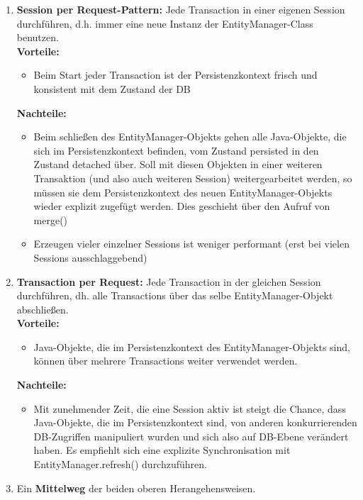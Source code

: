 \begin{enumerate}
    \item \textbf{Session per Request-Pattern:} Jede Transaction in einer eigenen Session durchführen, d.h. immer eine neue Instanz der EntityManager-Class benutzen.\\
          \textbf{Vorteile:}
          \begin{itemize}
              \item Beim Start jeder Transaction ist der Persistenzkontext frisch und konsistent mit dem Zustand der DB
          \end{itemize}
          \textbf{Nachteile:}
          \begin{itemize}
              \item Beim schließen des EntityManager-Objekts gehen alle Java-Objekte, die sich im Persistenzkontext befinden, vom Zustand persisted in den Zustand detached über. Soll mit diesen Objekten in einer weiteren Transaktion (und also auch weiteren Session) weitergearbeitet werden, so müssen sie dem Persistenzkontext des neuen EntityManager-Objekts wieder explizit zugefügt werden. Dies geschieht über den Aufruf von merge()
              \item Erzeugen vieler einzelner Sessions ist weniger performant (erst bei vielen Sessions ausschlaggebend)
          \end{itemize}
    \item \textbf{Transaction per Request:} Jede Transaction in der gleichen Session durchführen, dh. alle Transactions über das selbe EntityManager-Objekt abschließen.\\
          \textbf{Vorteile:}
          \begin{itemize}
              \item Java-Objekte, die im Persistenzkontext des EntityManager-Objekts sind, können über mehrere Transactions weiter verwendet werden.
          \end{itemize}
          \textbf{Nachteile:}
          \begin{itemize}
              \item Mit zunehmender Zeit, die eine Session aktiv ist steigt die Chance, dass Java-Objekte, die im Persistenzkontext sind, von anderen konkurrierenden DB-Zugriffen manipuliert wurden und sich also auf DB-Ebene verändert haben. Es empfiehlt sich eine explizite Synchronisation mit EntityManager.refresh() durchzuführen.
          \end{itemize}
    \item Ein \textbf{Mittelweg} der beiden oberen Herangehensweisen.
\end{enumerate}

